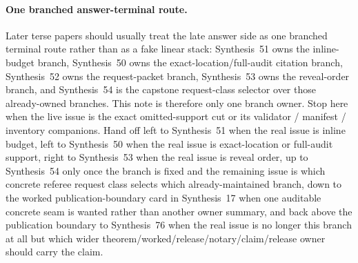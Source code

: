 \documentclass[11pt]{article}
\begin{document}
\paragraph{One branched answer-terminal route.}
Later terse papers should usually treat the late answer side as one branched terminal route rather than as a fake linear stack: Synthesis~51 owns the inline-budget branch, Synthesis~50 owns the exact-location/full-audit citation branch, Synthesis~52 owns the request-packet branch, Synthesis~53 owns the reveal-order branch, and Synthesis~54 is the capstone request-class selector over those already-owned branches. This note is therefore only one branch owner. Stop here when the live issue is the exact omitted-support cut or its validator / manifest / inventory companions. Hand off left to Synthesis~51 when the real issue is inline budget, left to Synthesis~50 when the real issue is exact-location or full-audit support, right to Synthesis~53 when the real issue is reveal order, up to Synthesis~54 only once the branch is fixed and the remaining issue is which concrete referee request class selects which already-maintained branch, down to the worked publication-boundary card in Synthesis~17 when one auditable concrete seam is wanted rather than another owner summary, and back above the publication boundary to Synthesis~76 when the real issue is no longer this branch at all but which wider theorem/worked/release/notary/claim/release owner should carry the claim.
\end{document}
